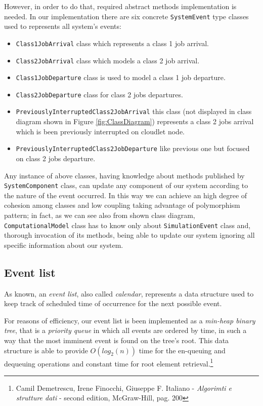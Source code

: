 \documentclass[10pt,a4paper]{article}
\begin{document}
However, in order to do that, required abstract methods implementation is needed. In our implementation there are six concrete \texttt{SystemEvent} type classes used to represents all system's events:

\begin{itemize}
\item \texttt{Class1JobArrival} class which represents a class 1 job arrival.
\item \texttt{Class2JobArrival} class which models a class 2 job arrival.
\item \texttt{Class1JobDeparture} class is used to model a class 1 job departure.
\item \texttt{Class2JobDeparture} class for class 2 jobs departures.
\item \texttt{PreviouslyInterruptedClass2JobArrival} this class (not displayed in class diagram shown in Figure \ref{fig:ClassDiagram}) represents a class 2 jobs arrival which is been previously interrupted on cloudlet node.
\item \texttt{PreviouslyInterruptedClass2JobDeparture} like previous one but focused on class 2 jobs departure.
\end{itemize}

Any instance of above classes, having knowledge about methods published by \texttt{SystemComponent} class, can update any component of our system according to the nature of the event occurred. In this way we can achieve an high degree of cohesion among classes and low coupling taking advantage of polymorphism pattern; in fact, as we can see also from shown class diagram, \texttt{ComputationalModel} class has to know only about \texttt{SimulationEvent} class and, thorough invocation of its methods, being able to update our system ignoring all specific information about our system.

\subsection{Event list}

As known, an \textit{event list}, also called \textit{calendar}, represents a data structure used to keep track of scheduled time of occurrence for the next possible event.

For reasons of efficiency, our event list is been implemented as a \textit{min-heap binary tree}, that is a \textit{priority queue} in which all events are ordered by time, in such a way that the most imminent event is found on the tree's root. This data structure is able to provide $O(log_2(n))$ time for the en-queuing and dequeuing operations and constant time for root element retrieval.\footnote{Camil Demetrescu, Irene Finocchi, Giuseppe F. Italiano - \textit{Algorimti e strutture dati} - second edition, McGraw-Hill, pag. 200} 
\end{document}
